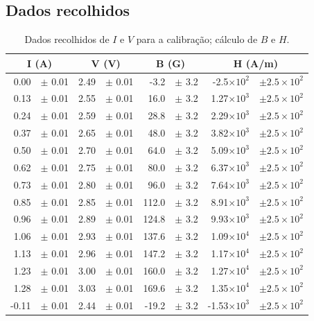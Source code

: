 \documentclass[a4paper]{article}
\begin{document}
\subsection{Dados recolhidos}
\begin{table}[htbp]
\center
\caption{Dados recolhidos de $I$ e $V$ para a calibração; cálculo de $B$ e $H$.}
\begin{tabular}{rlrlrlrl}
\hline
\multicolumn{ 2}{c}{I (A)} & \multicolumn{ 2}{c}{V (V)} & \multicolumn{ 2}{c}{B (G)} & \multicolumn{ 2}{c}{H (A/m)} \\ \hline

0.00 & $\pm$ 0.01 & 2.49 & $\pm$ 0.01 & -3.2 & $\pm$ 3.2 & -2.5$\times 10^{2}$ & $\pm 2.5 \times 10^{2}$  \\ 
0.13 & $\pm$ 0.01 & 2.55 & $\pm$ 0.01 & 16.0 & $\pm$ 3.2 & 1.27$\times 10^{3}$ & $\pm 2.5 \times 10^{2}$  \\ 
0.24 & $\pm$ 0.01 & 2.59 & $\pm$ 0.01 & 28.8 & $\pm$ 3.2 & 2.29$\times 10^{3}$ & $\pm 2.5 \times 10^{2}$  \\ 
0.37 & $\pm$ 0.01 & 2.65 & $\pm$ 0.01 & 48.0 & $\pm$ 3.2 & 3.82$\times 10^{3}$ & $\pm 2.5 \times 10^{2}$  \\ 
0.50 & $\pm$ 0.01 & 2.70 & $\pm$ 0.01 & 64.0 & $\pm$ 3.2 & 5.09$\times 10^{3}$ & $\pm 2.5 \times 10^{2}$  \\ 
0.62 & $\pm$ 0.01 & 2.75 & $\pm$ 0.01 & 80.0 & $\pm$ 3.2 & 6.37$\times 10^{3}$ & $\pm 2.5 \times 10^{2}$  \\ 
0.73 & $\pm$ 0.01 & 2.80 & $\pm$ 0.01 & 96.0 & $\pm$ 3.2 & 7.64$\times 10^{3}$ & $\pm 2.5 \times 10^{2}$  \\ 
0.85 & $\pm$ 0.01 & 2.85 & $\pm$ 0.01 & 112.0 & $\pm$ 3.2 & 8.91$\times 10^{3}$ & $\pm 2.5 \times 10^{2}$  \\ 
0.96 & $\pm$ 0.01 & 2.89 & $\pm$ 0.01 & 124.8 & $\pm$ 3.2 & 9.93$\times 10^{3}$ & $\pm 2.5 \times 10^{2}$  \\ 
1.06 & $\pm$ 0.01 & 2.93 & $\pm$ 0.01 & 137.6 & $\pm$ 3.2 & 1.09$\times 10^{4}$ & $\pm 2.5 \times 10^{2}$  \\ 
1.13 & $\pm$ 0.01 & 2.96 & $\pm$ 0.01 & 147.2 & $\pm$ 3.2 & 1.17$\times 10^{4}$ & $\pm 2.5 \times 10^{2}$  \\ 
1.23 & $\pm$ 0.01 & 3.00 & $\pm$ 0.01 & 160.0 & $\pm$ 3.2 & 1.27$\times 10^{4}$ & $\pm 2.5 \times 10^{2}$  \\ 
1.28 & $\pm$ 0.01 & 3.03 & $\pm$ 0.01 & 169.6 & $\pm$ 3.2 & 1.35$\times 10^{4}$ & $\pm 2.5 \times 10^{2}$  \\ 
-0.11 & $\pm$ 0.01 & 2.44 & $\pm$ 0.01 & -19.2 & $\pm$ 3.2 & -1.53$\times 10^{3}$ & $\pm 2.5 \times 10^{2}$  \\ 

\end{tabular}
\end{table}
\end{document}
